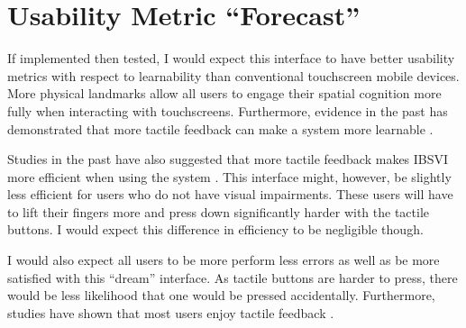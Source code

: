 \documentclass[11pt]{article}
\begin{document}
\section{Usability Metric ``Forecast''}
If implemented then tested, I would expect this interface to have better usability metrics with respect to learnability than conventional touchscreen mobile devices.  More physical landmarks allow all users to engage their spatial cognition more fully when interacting with touchscreens. Furthermore, evidence in the past has demonstrated  that more tactile feedback can make a system more learnable \cite{El-Glaly:2013:TTF:2460625.2460665, conf/chi/KaneWL11}. 

Studies in the past have also suggested that more tactile feedback makes IBSVI more efficient when using the system \cite{El-Glaly:2013:TTF:2460625.2460665, Buxton:1986:HID:22339.22386}. This interface might, however, be slightly less efficient for users who do not have visual impairments. These users will have to lift their fingers more and press down significantly harder with the tactile buttons. I would expect this difference in efficiency to be negligible though.

I would also expect all users to be more perform less errors as well as be more satisfied with this ``dream'' interface. As tactile buttons are harder to press, there would be less likelihood that one would be pressed accidentally. Furthermore, studies have shown that most users enjoy tactile feedback \cite{Freeman:2014:TFA:2663204.2663280}.

\clearpage


{}

\end{document}
